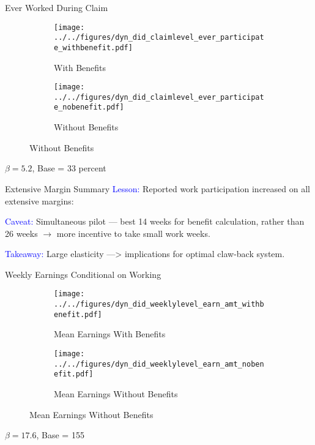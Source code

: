 \documentclass{beamer}
\begin{document}
\begin{frame}{Ever Worked During Claim}
\begin{figure}\centering
	\begin{subfigure}{.49\textwidth}\centering\caption{\footnotesize With Benefits}\label{map1}
	\texttt{[image: ../../figures/dyn\_did\_claimlevel\_ever\_participate\_withbenefit.pdf]}	
	\end{subfigure}
	\begin{subfigure}{.49\textwidth}\centering\caption{\footnotesize Without Benefits}\label{map1}
		\texttt{[image: ../../figures/dyn\_did\_claimlevel\_ever\_participate\_nobenefit.pdf]}	
	\end{subfigure}
\end{figure}
$\beta = 5.2$, Base = 33 percent
\end{frame}


\begin{frame}{Extensive Margin Summary}
\textcolor{blue}{Lesson:} Reported work participation increased on all extensive margins:

\bigskip
\bigskip

\textcolor{blue}{Caveat:} Simultaneous pilot --- best 14 weeks for benefit calculation, rather than 26 weeks $\rightarrow$ more incentive to take small work weeks.

\bigskip
\bigskip

\textcolor{blue}{Takeaway:} Large elasticity ---> implications for optimal claw-back system.
\end{frame}


\begin{frame}{Weekly Earnings Conditional on Working}
\begin{figure} \centering
	\begin{subfigure}{.49\textwidth}\centering\caption{\footnotesize Mean Earnings With Benefits}\label{map1}
	\texttt{[image: ../../figures/dyn\_did\_weeklylevel\_earn\_amt\_withbenefit.pdf]}	
\end{subfigure}
\begin{subfigure}{.49\textwidth}\centering\caption{\footnotesize Mean Earnings Without Benefits }\label{map2}
	\texttt{[image: ../../figures/dyn\_did\_weeklylevel\_earn\_amt\_nobenefit.pdf]}	
\end{subfigure}
\end{figure}
$\beta = 17.6$, Base = 155
\end{frame}
\end{document}
